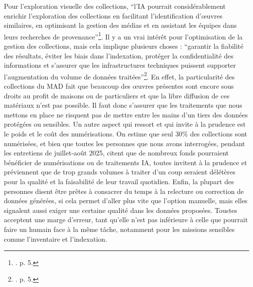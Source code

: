 Pour l'exploration visuelle des collections, \enquote{l'IA pourrait considérablement enrichir l'exploration des collections en facilitant l'identification d’œuvres similaires, en optimisant la gestion des médias et en assistant les équipes dans leurs recherches de provenance}\footnote{\cite{bermes_repenser_2025}. p. 5.}. Il y a un vrai intérêt pour l'optimisation de la gestion des collections, mais cela implique plusieurs choses : \enquote{garantir la fiabilité des résultats, éviter les biais dans l'indexation, protéger la confidentialité des informations et s'assurer que les infrastructures techniques puissent supporter l'augmentation du volume de données traitées}\footnote{\cite{bermes_repenser_2025}. p. 5.}. En effet, la particularité des collections du MAD fait que beaucoup des œuvres présentes sont encore sous droits au profit de maisons ou de particuliers et que la libre diffusion de ces matériaux n'est pas possible. Il faut donc s'assurer que les traitements que nous mettons en place ne risquent pas de mettre entre les mains d'un tiers des données protégées ou sensibles. Un autre aspect qui ressort et qui invite à la prudence est le poids et le coût des numérisations. On estime que seul 30\% des collections sont numérisées, et bien que toutes les personnes que nous avons interrogées, pendant les entretiens de juillet-août 2025, citent que de nombreux fonds pourraient bénéficier de numérisations ou de traitements IA, toutes invitent à la prudence et préviennent que de trop grands volumes à traiter d'un coup seraient délétères pour la qualité et la faisabilité de leur travail quotidien. Enfin, la plupart des personnes disent être prêtes à consacrer du temps à la relecture ou correction de données générées, si cela permet d'aller plus vite que l'option manuelle, mais elles signalent aussi exiger une certaine qualité dans les données proposées. Tous\wokisme tes acceptent une marge d'erreur, tant qu'elle n'est pas inférieure à celle que pourrait faire un humain face à la même tâche, notamment pour les missions sensibles comme l'inventaire et l'indexation.

